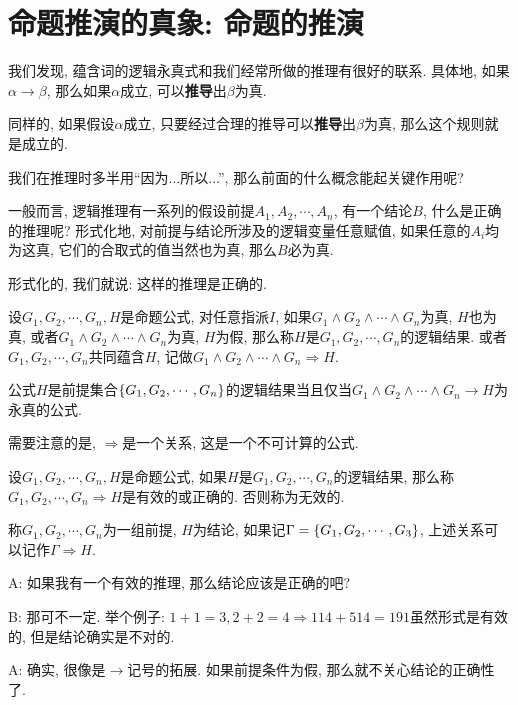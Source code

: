 \section{命题推演的真象: 命题的推演}

我们发现, 蕴含词的逻辑永真式和我们经常所做的推理有很好的联系. 具体地, 如果$\alpha \to \beta$, 那么如果$\alpha$成立, 可以\textbf{推导}出$\beta$为真. 

同样的, 如果假设$\alpha$成立, 只要经过合理的推导可以\textbf{推导}出$\beta$为真, 那么这个规则就是成立的.  


我们在推理时多半用“因为...所以...”, 那么前面的什么概念能起关键作用呢?

一般而言, 逻辑推理有一系列的假设前提$A_1,A_2,\cdots,A_n$, 有一个结论$B$, 什么是正确的推理呢? 形式化地, 对前提与结论所涉及的逻辑变量任意赋值, 如果任意的$A_i$均为这真, 它们的合取式的值当然也为真, 那么$B$必为真. 

形式化的, 我们就说: 这样的推理是正确的. 

\begin{definition}
	设$G_1,G_2,\cdots,G_n,H$是命题公式, 对任意指派$I$, 如果$G_1\land G_2\land \cdots\land G_n$为真, $H$也为真, 或者$G_1\land G_2\land \cdots\land G_n$为真, $H$为假, 那么称$H$是$G_1, G_2, \cdots, G_n$的逻辑结果. 或者$G_1, G_2, \cdots, G_n$共同蕴含$H$, 记做$G_1\land G_2\land \cdots\land G_n\Rightarrow H$. 
\end{definition}


\begin{theorem}
	公式$H$是前提集合$\{G_1,G_2,\cdots,G_n\}$的逻辑结果当且仅当$G_1\land G_2\land \cdots\land G_n\to H$为永真的公式. 
\end{theorem}

需要注意的是, $\Rightarrow$是一个关系, 这是一个不可计算的公式. 

\begin{definition}
	设$G_1, G_2, \cdots, G_n,H$是命题公式, 如果$H$是$G_1, G_2, \cdots, G_n$的逻辑结果, 那么称$G_1, G_2, \cdots, G_n\Rightarrow H$是有效的或正确的. 否则称为无效的. 
	
	称$G_1, G_2, \cdots, G_n$为一组前提, $H$为结论, 如果记$\Gamma=\{G_1,G_2,\cdots,G_3\}$, 上述关系可以记作$\Gamma\Rightarrow H$. 
\end{definition}

\begin{dialogue}
	A: 如果我有一个有效的推理, 那么结论应该是正确的吧? 
	
	B: 那可不一定. 举个例子: $1+1=3, 2+2=4 \Rightarrow 114+514=191$虽然形式是有效的, 但是结论确实是不对的.
	
	A: 确实, 很像是$\rightarrow$记号的拓展. 如果前提条件为假, 那么就不关心结论的正确性了. 
\end{dialogue}

